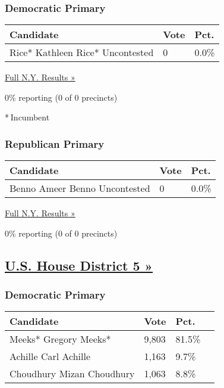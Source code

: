 \hypertarget{democratic-primary-4}{%
\subsubsection{Democratic Primary}\label{democratic-primary-4}}

\begin{longtable}[]{@{}lll@{}}
\toprule
Candidate & Vote & Pct.\tabularnewline
\midrule
\endhead
 Rice* Kathleen Rice* Uncontested & 0 & 0.0\%\tabularnewline
\bottomrule
\end{longtable}

\href{https://www.nytimes3xbfgragh.onion/elections/results/new-york}{Full
N.Y. Results »}

0\% reporting (0 of 0 precincts)

* Incumbent

\hypertarget{republican-primary-4}{%
\subsubsection{Republican Primary}\label{republican-primary-4}}

\begin{longtable}[]{@{}lll@{}}
\toprule
Candidate & Vote & Pct.\tabularnewline
\midrule
\endhead
 Benno Ameer Benno Uncontested & 0 & 0.0\%\tabularnewline
\bottomrule
\end{longtable}

\href{https://www.nytimes3xbfgragh.onion/elections/results/new-york}{Full
N.Y. Results »}

0\% reporting (0 of 0 precincts)

\hypertarget{us-house-district-5-}{%
\subsection{\texorpdfstring{\href{https://www.nytimes3xbfgragh.onion/elections/results/new-york-house-district-5-primary-election}{U.S.
House District 5
»}}{U.S. House District 5 »}}\label{us-house-district-5-}}

\hypertarget{democratic-primary-5}{%
\subsubsection{Democratic Primary}\label{democratic-primary-5}}

\begin{longtable}[]{@{}llll@{}}
\toprule
Candidate & Vote & Pct. &\tabularnewline
\midrule
\endhead
 Meeks* Gregory Meeks* & 9,803 & 81.5\% &\tabularnewline
 Achille Carl Achille & 1,163 & 9.7\% &\tabularnewline
 Choudhury Mizan Choudhury & 1,063 & 8.8\% &\tabularnewline
\bottomrule
\end{longtable}

